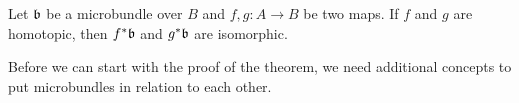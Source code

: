 \begin{mytheorem}\label{homotopy::theorem}%
    Let $\mathfrak{b}$ be a microbundle over $B$ and $f, g: A \to B$ be two maps.
    If $f$ and $g$ are homotopic, then $f^*\mathfrak{b}$ and $g^*\mathfrak{b}$ are isomorphic.
\end{mytheorem}

\begin{myparagraph}
    Before we can start with the proof of the theorem,
    we need additional concepts to put microbundles in relation to each other.
\end{myparagraph}
